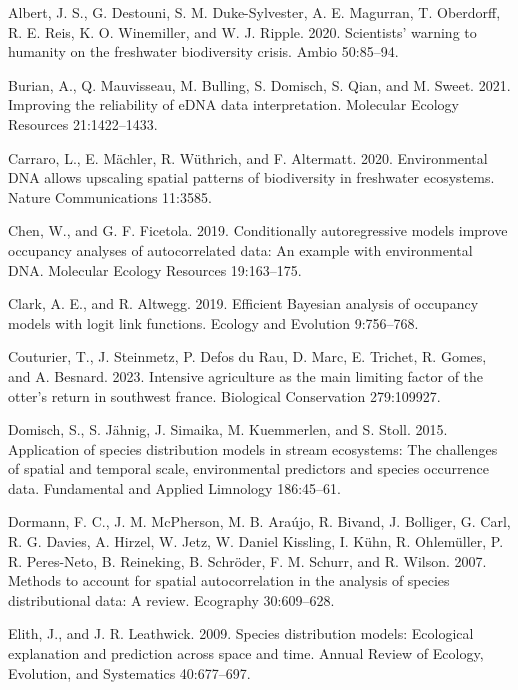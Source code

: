 \documentclass[
  11pt,
  a4paper,
]{article}
\newlength{\cslhangindent}
\newenvironment{CSLReferences}[2] %
 {\begin{list}{}{%
  \setlength{\itemindent}{0pt}
  \setlength{\leftmargin}{0pt}
  \setlength{\parsep}{0pt}
  \ifodd #1
   \setlength{\leftmargin}{\cslhangindent}
   \setlength{\itemindent}{-1\cslhangindent}
  \fi
  \setlength{\itemsep}{#2\baselineskip}}}
 {\end{list}}
\begin{document}
\label{refs}
\begin{CSLReferences}{1}{0}
Albert, J. S., G. Destouni, S. M. Duke-Sylvester, A. E. Magurran, T. Oberdorff, R. E. Reis, K. O. Winemiller, and W. J. Ripple. 2020. Scientists' warning to humanity on the freshwater biodiversity crisis. Ambio 50:85--94.

Burian, A., Q. Mauvisseau, M. Bulling, S. Domisch, S. Qian, and M. Sweet. 2021. Improving the reliability of eDNA data interpretation. Molecular Ecology Resources 21:1422--1433.

Carraro, L., E. Mächler, R. Wüthrich, and F. Altermatt. 2020. Environmental DNA allows upscaling spatial patterns of biodiversity in freshwater ecosystems. Nature Communications 11:3585.

Chen, W., and G. F. Ficetola. 2019. Conditionally autoregressive models improve occupancy analyses of autocorrelated data: An example with environmental DNA. Molecular Ecology Resources 19:163--175.

Clark, A. E., and R. Altwegg. 2019. Efficient {B}ayesian analysis of occupancy models with logit link functions. Ecology and Evolution 9:756--768.

Couturier, T., J. Steinmetz, P. Defos du Rau, D. Marc, E. Trichet, R. Gomes, and A. Besnard. 2023. Intensive agriculture as the main limiting factor of the otter's return in southwest france. Biological Conservation 279:109927.

Domisch, S., S. Jähnig, J. Simaika, M. Kuemmerlen, and S. Stoll. 2015. Application of species distribution models in stream ecosystems: The challenges of spatial and temporal scale, environmental predictors and species occurrence data. Fundamental and Applied Limnology 186:45--61.

Dormann, F. C., J. M. McPherson, M. B. Araújo, R. Bivand, J. Bolliger, G. Carl, R. G. Davies, A. Hirzel, W. Jetz, W. Daniel Kissling, I. Kühn, R. Ohlemüller, P. R. Peres-Neto, B. Reineking, B. Schröder, F. M. Schurr, and R. Wilson. 2007. Methods to account for spatial autocorrelation in the analysis of species distributional data: A review. Ecography 30:609--628.

Elith, J., and J. R. Leathwick. 2009. Species distribution models: Ecological explanation and prediction across space and time. Annual Review of Ecology, Evolution, and Systematics 40:677--697.


\end{CSLReferences}
\end{document}
